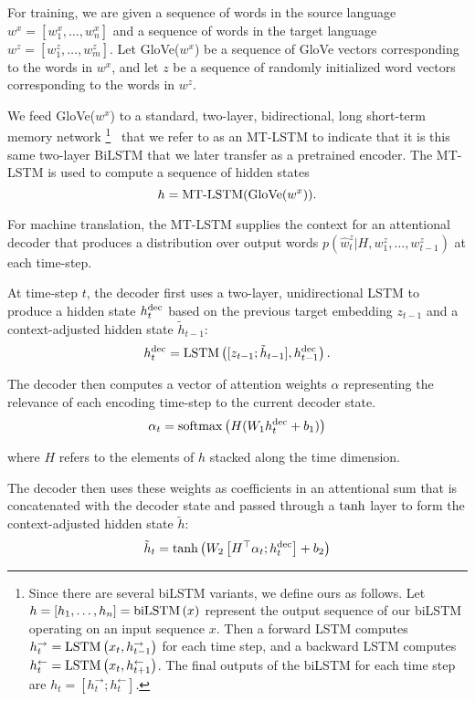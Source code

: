 \documentclass{article}
\newcommand{\forward}{\rightarrow}
\newcommand{\backward}{\leftarrow}
\newcommand{\lstm}[2]{{\rm LSTM} \left( #1 , #2 \right)}
\newcommand{\bilstm}[1]{{\rm biLSTM} \left( #1 \right)}
\newcommand{\dec}{^{\rm dec}}
\newcommand{\softmax}[1]{{\rm softmax} \left( #1 \right)}
\newcommand{\ftanh}[1]{{\rm tanh} \left( #1 \right)}
\begin{document}
For training, 
we are given a sequence of words in the source language 
$w^{x}=[w^{x}_1, \ldots, w^{x}_n]$ 
and a sequence of words in the target language
$w^{z}=[w^{z}_1, \ldots, w^{z}_m]$. 
Let GloVe($w^x$)
be a sequence of GloVe vectors corresponding to the words in $w^x$,
and let $z$ be a sequence of randomly initialized word vectors corresponding to the words in $w^z$.

We feed GloVe($w^x$) to a standard, two-layer, bidirectional, long short-term memory network
\footnote{
Since there are several biLSTM variants, we define ours as follows. Let $h=[h_1, \ldots, h_n]=\bilstm{x}$ represent the output sequence of our biLSTM operating on an input sequence $x$. Then a forward LSTM computes $h^{\forward}_t = \lstm{x_t}{h^{\forward}_{t-1}}$ 
for each time step, and a backward LSTM computes 
$h^{\backward}_t = \lstm{x_t}{h^{\backward}_{t+1}}$.
The final outputs of the biLSTM for each time step are 
$h_t = \left[ h^{\forward}_t; h^{\backward}_t \right]$.
}~\citep{graves2005framewise} 
that we refer to as an MT-LSTM 
to indicate that it is this same two-layer BiLSTM that we later transfer as a pretrained encoder.
The MT-LSTM  is used to compute a sequence of hidden states
\begin{equation}
h = \text{\rm MT-LSTM}(\text{GloVe}(w^x)).
\label{eq:mtlstm}
\end{equation}

For machine translation, 
the MT-LSTM supplies the context for an attentional decoder 
that produces a distribution over output words 
$p(\hat{w}^z_t|H,w^z_1,\ldots,w^z_{t-1})$ at each time-step.

At time-step $t$, 
the decoder first uses a two-layer, 
unidirectional LSTM to produce a hidden state $h\dec_t$ 
based on the previous target embedding $z_{t-1}$ 
and a context-adjusted hidden state $\tilde h_{t-1}$:
\begin{equation}
h\dec_{t} = \lstm{ [ z_{t-1}; \tilde h_{t-1} ] }{h\dec_{t-1}}.
\end{equation}

The decoder then computes a vector of attention weights $\alpha$ 
representing the relevance of each encoding time-step to the current decoder state.
\begin{equation}
\alpha_{t} = \softmax{H (W_1 h\dec_{t} + b_1)}
\end{equation}

where $H$ refers to the elements of $h$ stacked along the time dimension.

The decoder then uses these weights as coefficients in an attentional sum
that is concatenated with the decoder state 
and passed through a $\rm tanh$ layer
to form the context-adjusted hidden state $\tilde{h}$:
\begin{equation}
\tilde h_{t} = \ftanh{W_2 \left[ H^\top \alpha_t ; h\dec_{t} \right ] + b_2}
\end{equation}
\end{document}
